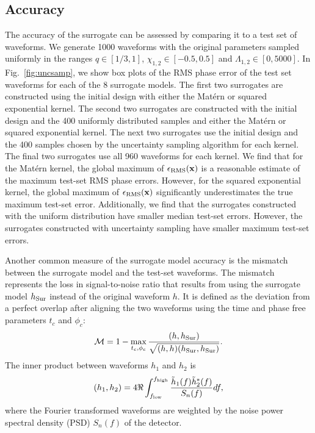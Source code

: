 \documentclass[prd,aps,letter,twocolumn,floatfix,notitlepage,nofootinbib]{revtex4-1}
\def\bx{\mathbf{x}}
\begin{document}
\subsection{Accuracy}
\label{sec:accuracy}

The accuracy of the surrogate can be assessed by comparing it to a test set of waveforms. We generate 1000 waveforms with the original parameters sampled uniformly in the ranges $q \in [1/3, 1]$, $\chi_{1,2} \in [-0.5, 0.5]$ and $\Lambda_{1,2} \in [0, 5000]$. In Fig.~\ref{fig:uncsamp}, we show box plots of the RMS phase error of the test set waveforms for each of the 8 surrogate models. The first two surrogates are constructed using the initial design with either the Mat\'{e}rn or squared exponential kernel. The second two surrogates are constructed with the initial design and the 400 uniformly distributed samples and either the Mat\'{e}rn or squared exponential kernel. The next two surrogates use the initial design and the 400 samples chosen by the uncertainty sampling algorithm for each kernel. The final two surrogates use all 960 waveforms for each kernel. We find that for the Mat\'{e}rn kernel, the global maximum of $\epsilon_{\rm RMS}(\bx)$ is a reasonable estimate of the maximum test-set RMS phase errors. However, for the squared exponential kernel, the global maximum of $\epsilon_{\rm RMS}(\bx)$ significantly underestimates the true maximum test-set error. Additionally, we find that the surrogates constructed with the uniform distribution have smaller median test-set errors. However, the surrogates constructed with uncertainty sampling have smaller maximum test-set errors.

Another common measure of the surrogate model accuracy is the mismatch between the surrogate model and the test-set waveforms.
The mismatch represents the loss in signal-to-noise ratio that results from using the surrogate model $h_{\rm Sur}$ instead of the original waveform $h$. It is defined as the deviation from a perfect overlap after aligning the two waveforms using the time and phase free parameters $t_c$ and $\phi_c$:
\begin{equation}
\mathcal{M} = 1 - \max_{t_c, \phi_c} \frac{(h, h_{\rm Sur})} {\sqrt{(h, h) (h_{\rm Sur}, h_{\rm Sur})}}.
\end{equation}
The inner product between waveforms $h_1$ and $h_2$ is
\begin{equation}
(h_1, h_2) = 4 \Re \int_{f_{\rm low}}^{f_{\rm high}} \frac{\tilde h_1(f) \tilde h^*_2(f)} {S_n(f)} df,
\end{equation}
where the Fourier transformed waveforms are weighted by the noise power spectral density (PSD) $S_n(f)$ of the detector.
\end{document}

